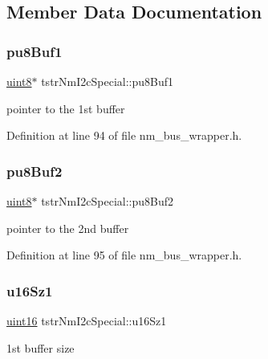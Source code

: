 \subsection{Member Data Documentation}
\mbox{\label{structtstrNmI2cSpecial_a4f89ccd58c1642e11c466d35c7338dca}} 
\subsubsection{\texorpdfstring{pu8\+Buf1}{pu8Buf1}}
{\footnotesize\ttfamily \hyperlink{group__DataT_ga4df709a77647e870bbf1d955b8edc9a6}{uint8}$\ast$ tstr\+Nm\+I2c\+Special\+::pu8\+Buf1}

pointer to the 1st buffer 

Definition at line 94 of file nm\+\_\+bus\+\_\+wrapper.\+h.

\mbox{\label{structtstrNmI2cSpecial_aa20afa1ba217ce6d90a249aa279b84b0}} 
\subsubsection{\texorpdfstring{pu8\+Buf2}{pu8Buf2}}
{\footnotesize\ttfamily \hyperlink{group__DataT_ga4df709a77647e870bbf1d955b8edc9a6}{uint8}$\ast$ tstr\+Nm\+I2c\+Special\+::pu8\+Buf2}

pointer to the 2nd buffer 

Definition at line 95 of file nm\+\_\+bus\+\_\+wrapper.\+h.

\mbox{\label{structtstrNmI2cSpecial_aeb07c4e8ea1caeb52f94a2f57b3eefcf}} 
\subsubsection{\texorpdfstring{u16\+Sz1}{u16Sz1}}
{\footnotesize\ttfamily \hyperlink{group__DataT_ga1daa745171fc6e31d942c161422a76f9}{uint16} tstr\+Nm\+I2c\+Special\+::u16\+Sz1}

1st buffer size 

